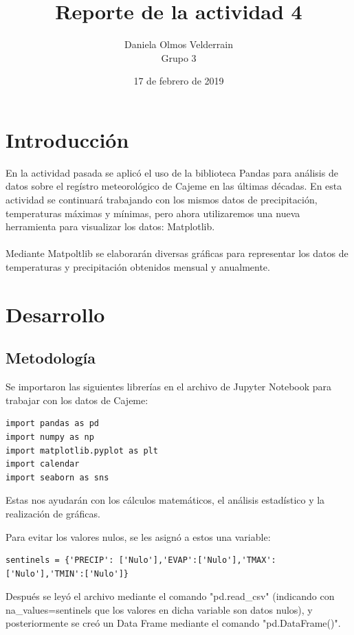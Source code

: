 \documentclass[letterpaper,12pt]{article}
\begin{document}
\title{Reporte de la actividad 4}
\author{Daniela Olmos Velderrain\\Grupo 3}
\date{17 de febrero de 2019}

\maketitle

\section{Introducción}

En la actividad pasada se aplicó el uso de la biblioteca Pandas para análisis de datos sobre el regístro meteorológico de Cajeme en las últimas décadas. En esta actividad se continuará trabajando con los mismos datos de precipitación, temperaturas máximas y mínimas, pero ahora utilizaremos una nueva herramienta para visualizar los datos: Matplotlib. 
\\
\\
Mediante Matpoltlib se elaborarán diversas gráficas para representar los datos de temperaturas y precipitación obtenidos mensual y anualmente.

\section{Desarrollo}
\subsection{Metodología} 
Se importaron las siguientes librerías en el archivo de Jupyter Notebook para trabajar con los datos de Cajeme:

\begin{verbatim}
import pandas as pd
import numpy as np
import matplotlib.pyplot as plt
import calendar
import seaborn as sns
\end{verbatim}

Estas nos ayudarán con los cálculos matemáticos, el análisis estadístico y la realización de gráficas.

Para evitar los valores nulos, se les asignó a estos una variable:

\begin{verbatim}
sentinels = {'PRECIP': ['Nulo'],'EVAP':['Nulo'],'TMAX':['Nulo'],'TMIN':['Nulo']}
\end{verbatim} 

Después se leyó el archivo mediante el comando "pd.read\_csv" (indicando con na\_values=sentinels que los valores en dicha variable son datos nulos), y posteriormente se creó un Data Frame mediante el comando "pd.DataFrame()".
\end{document}
